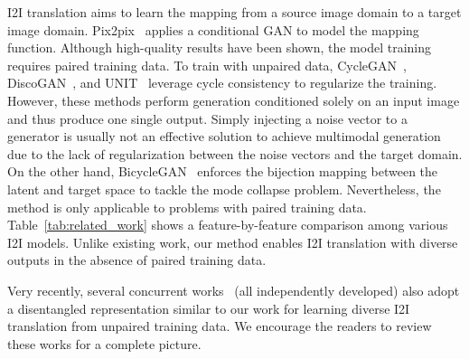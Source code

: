 \documentclass[runningheads]{llncs}
\renewcommand{\jiabin}[1]{}
\begin{document}
\vspace{\paramargin}
I2I translation aims to learn the mapping from a source image domain to a target image domain.
% 
%
Pix2pix~\cite{isola2017pix2pix} applies a conditional GAN to model the mapping function.
%
Although high-quality results have been shown, the model training requires paired training data. 
%
To train with unpaired data, CycleGAN~\cite{zhu2017cyclegan}, DiscoGAN~\cite{kim2017discogan}, and UNIT~\cite{liu2017unit} leverage cycle consistency to regularize the training.
%
However, these methods perform generation conditioned solely on an input image and thus produce one single output.
Simply injecting a noise vector to a generator is usually not an effective solution to achieve multimodal generation due to the lack of regularization between the noise vectors and the target domain. 
%
On the other hand, BicycleGAN~\cite{zhu2017bicyclegan} enforces the bijection mapping between the latent and target space to tackle the mode collapse problem.
%
Nevertheless, the method is only applicable to problems with paired training data. 
%
Table~\ref{tab:related_work} shows a feature-by-feature comparison among various I2I models. 
%
Unlike existing work, our method enables I2I translation with diverse outputs in the absence of paired training data.
%

Very recently, several concurrent works~\cite{almahairi2018augmented,huang2018munit,cao2018dida,ma2018exemplar} (all independently developed) also adopt a disentangled representation similar to our work for learning diverse I2I translation from unpaired training data.
%
We encourage the readers to review these works for a complete picture.
%
%
\vspace{\paramargin}
\end{document}
